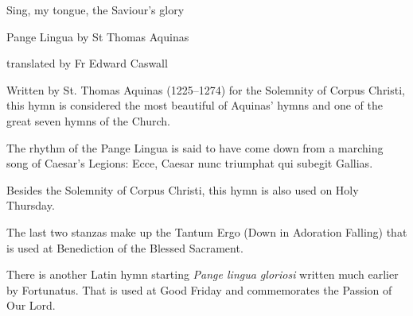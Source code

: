 \documentclass[a5paper,12pt,twoside]{memoir}
\begin{document}

\centerline{\Large Sing, my tongue, the Saviour's glory}

\smallskip

\centerline{\large Pange Lingua by St Thomas Aquinas}

\smallskip


\centerline{\large translated by Fr Edward Caswall}


\bigskip

Written by St. Thomas Aquinas (1225--1274) for the Solemnity of Corpus Christi, this hymn is considered the most beautiful of Aquinas' hymns and one of the great seven hymns of the Church. 

The rhythm of the Pange Lingua is said to have come down from a marching song of Caesar's Legions: Ecce, Caesar nunc triumphat qui subegit Gallias. 

Besides the Solemnity of Corpus Christi, this hymn is also used on Holy Thursday. 

The last two stanzas make up the Tantum Ergo (Down in Adoration Falling) that is used at Benediction of the Blessed Sacrament.


There is another Latin hymn starting \emph{Pange lingua gloriosi} written much earlier by Fortunatus.  That is used at Good Friday and commemorates the Passion of Our Lord.
\end{document}
